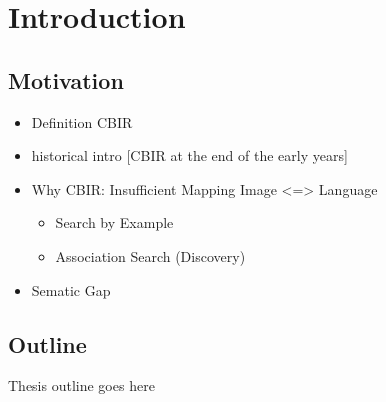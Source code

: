 \chapter{Introduction}\label{ch:introduction}

\section{Motivation}

\begin{itemize}
    \item Definition CBIR
    \item historical intro [CBIR at the end of the early years]
    \item Why CBIR: Insufficient Mapping Image <=> Language
        \begin{itemize}
            \item Search by Example
            \item Association Search (Discovery)
        \end{itemize}
    \item Sematic Gap
\end{itemize}


\section{Outline}

Thesis outline goes here
